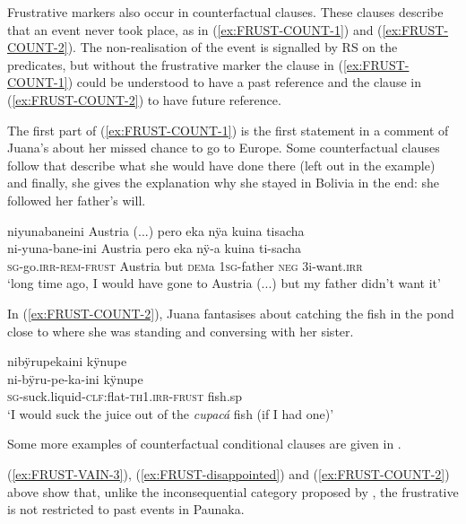 Frustrative markers also occur in counterfactual clauses. These clauses describe that an event never took place, as in (\ref{ex:FRUST-COUNT-1}) and (\ref{ex:FRUST-COUNT-2}). The non-realisation of the event is signalled by  RS on the predicates, but without the frustrative marker the clause in (\ref{ex:FRUST-COUNT-1}) could be understood to have a  past reference and the clause in (\ref{ex:FRUST-COUNT-2}) to have future reference.  

The first part of (\ref{ex:FRUST-COUNT-1}) is the first statement in a comment of Juana’s about her missed chance to go to Europe. Some counterfactual clauses follow that describe what she would have done there (left out in the example) and finally, she gives the explanation why she stayed in Bolivia in the end: she followed her father’s will.

\ea\label{ex:FRUST-COUNT-1}
\begingl 
\glpreamble niyunabaneini Austria (...) pero eka nÿa kuina tisacha\\
\gla ni-yuna-bane-ini Austria pero eka nÿ-a kuina ti-sacha\\ 
\textsc{sg}-go.\textsc{irr}-\textsc{rem}-\textsc{frust} Austria but \textsc{dem}a 1\textsc{sg}-father \textsc{neg} 3i-want.\textsc{irr}\\ 
\glft ‘long time ago, I would have gone to Austria (...) but my father didn’t want it’ \\ 
\endgl
{}
\xe

In (\ref{ex:FRUST-COUNT-2}), Juana fantasises about catching the fish in the pond close to where she was standing and conversing with her sister.

\ea\label{ex:FRUST-COUNT-2}
\begingl 
\glpreamble nibÿrupekaini kÿnupe\\
\gla ni-bÿru-pe-ka-ini kÿnupe\\ 
\textsc{sg}-suck.liquid-\textsc{clf}:flat-\textsc{th}1.\textsc{irr}-\textsc{frust} fish.sp\\ 
\glft ‘I would suck the juice out of the \textit{cupacá} fish (if I had one)’\\ 
\endgl
{}
\xe

Some more examples of counterfactual conditional clauses are given in .

(\ref{ex:FRUST-VAIN-3}), (\ref{ex:FRUST-disappointed}) and (\ref{ex:FRUST-COUNT-2}) above show that, unlike the inconsequential category proposed by \citet[]{Kuteva2019}, the frustrative is not restricted to past events in Paunaka.

